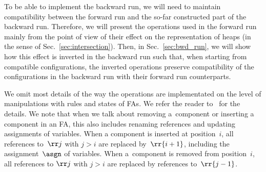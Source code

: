 {%
%
To be able to implement the backward run, we will need to maintain
compatibility between the forward run and the so-far constructed part
of the backward run.
%
Therefore, we will present the operations used in the forward run mainly from
the point of view of their effect on the representation  of heaps (in the sense
of Sec.~\ref{sec:intersection}).
%
Then, in Sec.~\ref{sec:bwd_run}, we will show how this effect is inverted in
the backward run such that, when starting from compatible
configurations, the inverted operations preserve compatibility of the
configurations in the backward run with their forward run counterparts.



%
We omit most details of the way the operations are implementated on the level of manipulations with rules and states of FAs. 
We refer the reader to~\cite{forester12,jiri:diza} for the details.
%
We note that when we talk about removing a~component or inserting a component
in an FA, this also includes renaming references and updating
assignments of variables.
%
When a component is inserted at position~$i$, all references to~$\rr j$ with
$j>i$ are replaced by~$\rr{i+1}$, including the assignment~$\asgn$ of variables.
%
When a~component is removed from position~$i$, all references to $\rr j$ with $j > i$ are
replaced by references to~$\rr{j-1}$. 




%
%

}
